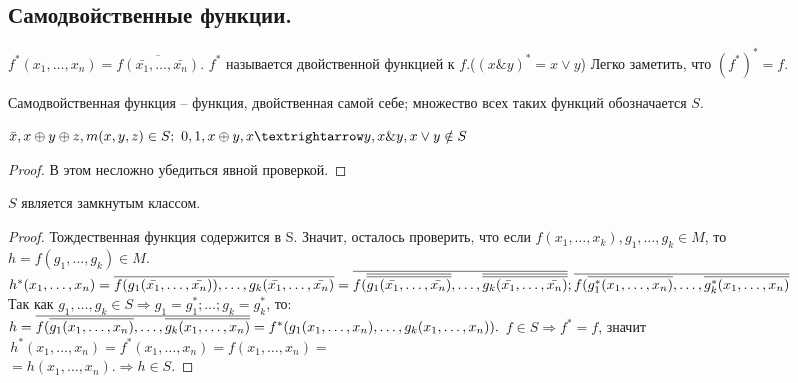 \subsection{Самодвойственные функции.}
	$f^*(x_1,\ldots,x_n)=\overline{f(\bar{x_1},\ldots,\bar{x_n})}.$ $f^*$ называется двойственной функцией к $f$.($(x\&y)^*=x \vee y$)	
	Легко заметить, что $(f^*)^*=f.$
	\begin{definition}
		Самодвойственная функция -- функция, двойственная самой себе; множество всех таких функций обозначается $S$.
	\end{definition}
\begin{statement}
	$\bar{x},x\oplus y \oplus z, m(x,y,z) \in S; ~
	0,1,x\oplus y, x\textrightarrow y, x \& y, x \vee y \notin S $ 
\end{statement}
\begin{proof}
	В этом несложно убедиться явной проверкой. 
\end{proof}	
\begin{lemma}
	$S$ является замкнутым классом.
\end{lemma}
\begin{proof}
	Тождественная функция содержится в S. Значит, осталось проверить, что если $f(x_1, \ldots,x_k), g_1, \ldots, g_k \in M$, то $h=f(g_1,\ldots,g_k) \in M $. \\
	$h^*(x_1,\ldots,x_n)=\overline{f(g_1(\bar{x_1},\ldots,\bar{x_n})),\ldots,g_k(\bar{x_1},\ldots,\bar{x_n})}=\overline{f(\overline{\overline{g_1(\bar{x_1},\ldots,\bar{x_n})}},\ldots,\overline{\overline{g_k(\bar{x_1},\ldots,\bar{x_n})}}}; \\\overline{f(\overline{g^*_{1}({x_1},\ldots,{x_n})},\ldots,\overline{g^*_k({x_1},\ldots,{x_n})}} $ \\
	Так как $g_1,\ldots,g_k \in S \Rightarrow g_1=g^*_1;\ldots;g_k=g^*_k$, то: \\
	$h=\overline{f(\overline{g_{1}({x_1},\ldots,{x_n})},\ldots,\overline{g_k({x_1},\ldots,{x_n})}}=f^*(g_1(x_1,\ldots, x_n),\ldots,g_k(x_1,\ldots,x_n)).\\ $
	$f \in S \Rightarrow f^*=f$, значит 
	$\,h^*(x_1,\ldots,x_n)=f^*(x_1,\ldots,x_n)=f(x_1,\ldots,x_n)=$\\$=h(x_1,\ldots,x_n). \Rightarrow h \in S.$
\end{proof}
